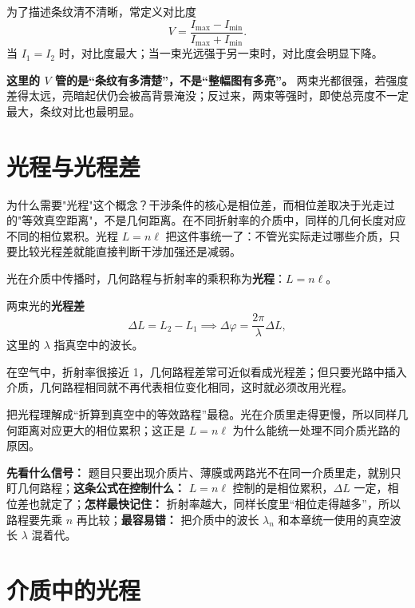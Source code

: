 \documentclass[lang=cn,11pt]{elegantbook}
\newcommand{\bridge}[1]{\begin{note}#1\end{note}}
\begin{document}
为了描述条纹清不清晰，常定义对比度
\[
V=\frac{I_{\max}-I_{\min}}{I_{\max}+I_{\min}}.
\]
当 \(I_1=I_2\) 时，对比度最大；当一束光远强于另一束时，对比度会明显下降。

\begin{note}
\textbf{这里的 \(V\) 管的是“条纹有多清楚”，不是“整幅图有多亮”。} 两束光都很强，若强度差得太远，亮暗起伏仍会被高背景淹没；反过来，两束等强时，即使总亮度不一定最大，条纹对比也最明显。
\end{note}

\section{光程与光程差}

\bridge{为什么需要"光程"这个概念？干涉条件的核心是相位差，而相位差取决于光走过的"等效真空距离"，不是几何距离。在不同折射率的介质中，同样的几何长度对应不同的相位累积。光程 \(L=n\ell\) 把这件事统一了：不管光实际走过哪些介质，只要比较光程差就能直接判断干涉加强还是减弱。}

\begin{definition}[光程]\label{def:optical-path}
光在介质中传播时，几何路程与折射率的乘积称为\textbf{光程}：\(L=n\ell\)。
\end{definition}

两束光的\textbf{光程差}
\[
\Delta L=L_2-L_1 \implies \Delta\varphi=\frac{2\pi}{\lambda}\Delta L,
\]
这里的 \(\lambda\) 指真空中的波长。

\bridge{在空气中，折射率很接近 1，几何路程差常可近似看成光程差；但只要光路中插入介质，几何路程相同就不再代表相位变化相同，这时就必须改用光程。}

把光程理解成“折算到真空中的等效路程”最稳。光在介质里走得更慢，所以同样几何距离对应更大的相位累积；这正是 \(L=n\ell\) 为什么能统一处理不同介质光路的原因。

\begin{note}
\textbf{先看什么信号：} 题目只要出现介质片、薄膜或两路光不在同一介质里走，就别只盯几何路程；\textbf{这条公式在控制什么：} \(L=n\ell\) 控制的是相位累积，\(\Delta L\) 一定，相位差也就定了；\textbf{怎样最快记住：} 折射率越大，同样长度里“相位走得越多”，所以路程要先乘 \(n\) 再比较；\textbf{最容易错：} 把介质中的波长 \(\lambda_n\) 和本章统一使用的真空波长 \(\lambda\) 混着代。
\end{note}

\section{介质中的光程}
\end{document}
